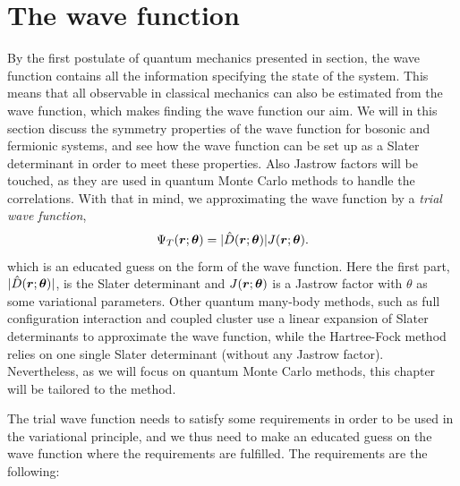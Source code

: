\section{The wave function} \label{sec:wavefunction}
By the first postulate of quantum mechanics presented in section, the wave function contains all the information specifying the state of the system. This means that all observable in classical mechanics can also be estimated from the wave function, which makes finding the wave function our aim. We will in this section discuss the symmetry properties of the wave function for bosonic and fermionic systems, and see how the wave function can be set up as a Slater determinant in order to meet these properties. Also Jastrow factors will be touched, as they are used in quantum Monte Carlo methods to handle the correlations. With that in mind, we approximating the wave function by a \textit{trial wave function},
\begin{equation}
\Psi_T(\boldsymbol{{r}};\boldsymbol{{\theta}})=|\hat{D}(\boldsymbol{{r}};\boldsymbol{{\theta}})|J(\boldsymbol{{r}};\boldsymbol{{\theta}}).
\end{equation}
which is an educated guess on the form of the wave function. 
Here the first part, $|\hat{D}(\boldsymbol{{r}};\boldsymbol{{\theta}})|$, is the Slater determinant and $J(\boldsymbol{{r}};\boldsymbol{{\theta}})$ is a Jastrow factor with $\theta$ as some variational parameters. Other quantum many-body methods, such as full configuration interaction and coupled cluster use a linear expansion of Slater determinants to approximate the wave function, while the Hartree-Fock method relies on one single Slater determinant (without any Jastrow factor). Nevertheless, as we will focus on quantum Monte Carlo methods, this chapter will be tailored to the method. 

The trial wave function needs to satisfy some requirements in order to be used in the variational principle, and we thus need to make an educated guess on the wave function where the requirements are fulfilled. The requirements are the following:

